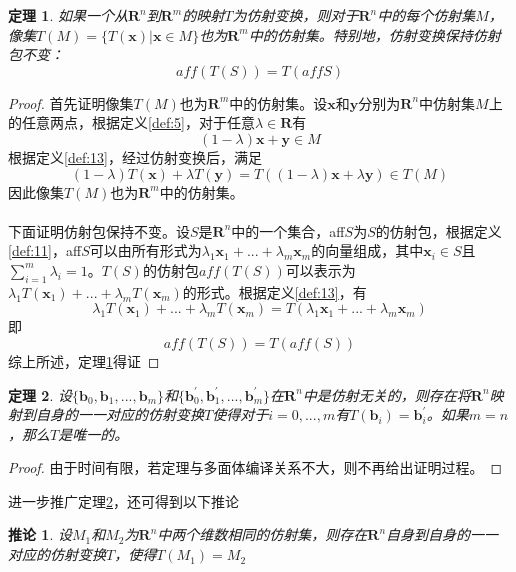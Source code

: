 \documentclass[a4paper,11pt,oneside]{article}
\newtheorem{theorem}{定理}[section]
\newtheorem{proof}{证明}[section]
\newtheorem{inference}{推论}[section]
\begin{document}
			\begin{theorem}
				\label{the:1.6}
				如果一个从$\textbf{R}^{n}$到$\textbf{R}^{m}$的映射$T$为仿射变换，则对于$\textbf{R}^{n}$中的每个仿射集$M$，像集$T(M)=\{T(\textbf{x})|\textbf{x}\in M\}$也为$\textbf{R}^{m}$中的仿射集。特别地，仿射变换保持仿射包不变：
				$$aff(T(S))=T(affS)$$
			\end{theorem}
			\begin{proof}
				首先证明像集$T(M)$也为$\textbf{R}^{m}$中的仿射集。设$\textbf{x}$和$\textbf{y}$分别为$\textbf{R}^{n}$中仿射集$M$上的任意两点，根据定义\ref{def:5}，对于任意$\lambda \in \textbf{R}$有
				$$(1-\lambda)\textbf{x}+\textbf{y}\in M$$
				根据定义\ref{def:13}，经过仿射变换后，满足
				$$(1-\lambda)T(\textbf{x})+\lambda T(\textbf{y})=T((1-\lambda)\textbf{x}+\lambda \textbf{y})\in T(M)$$
				因此像集$T(M)$也为$\textbf{R}^{m}$中的仿射集。\\
				\\
				下面证明仿射包保持不变。设$S$是$\textbf{R}^{n}$中的一个集合，aff$S$为$S$的仿射包，根据定义\ref{def:11}，aff$S$可以由所有形式为$\lambda_{1}\textbf{x}_{1}+...+\lambda_{m}\textbf{x}_{m}$的向量组成，其中$\textbf{x}_{i}\in S$且$\sum_{i=1}^{m}\lambda_{i}=1$。$T(S)$的仿射包$aff(T(S))$可以表示为$\lambda_{1}T(\textbf{x}_{1})+...+\lambda_{m}T(\textbf{x}_{m})$的形式。根据定义\ref{def:13}，有
				$$\lambda_{1}T(\textbf{x}_{1})+...+\lambda_{m}T(\textbf{x}_{m})=T(\lambda_{1}\textbf{x}_{1}+...+\lambda_{m}\textbf{x}_{m})$$
				即
				$$aff(T(S))=T(aff(S))$$
				综上所述，定理\ref{the:1.6}得证
			\end{proof}
			\begin{theorem}
				\label{the:1.7}
				设$\{\textbf{b}_{0},\textbf{b}_{1},...,\textbf{b}_{m}\}$和$\{\textbf{b}_{0}^{'},\textbf{b}_{1}^{'},...,\textbf{b}_{m}^{'}\}$在$\textbf{R}^{n}$中是仿射无关的，则存在将$\textbf{R}^{n}$映射到自身的一一对应的仿射变换$T$使得对于$i=0,...,m$有$T(\textbf{b}_{i})=\textbf{b}_{i}^{'}$。如果$m=n$，那么$T$是唯一的。
			\end{theorem}
			\begin{proof}
				由于时间有限，若定理与多面体编译关系不大，则不再给出证明过程。
			\end{proof}
			进一步推广定理\ref{the:1.7}，还可得到以下推论
			\begin{inference}
				设$M_{1}$和$M_{2}$为$\textbf{R}^{n}$中两个维数相同的仿射集，则存在$\textbf{R}^{n}$自身到自身的一一对应的仿射变换$T$，使得$T(M_{1})=M_{2}$
			\end{inference}
\end{document}
